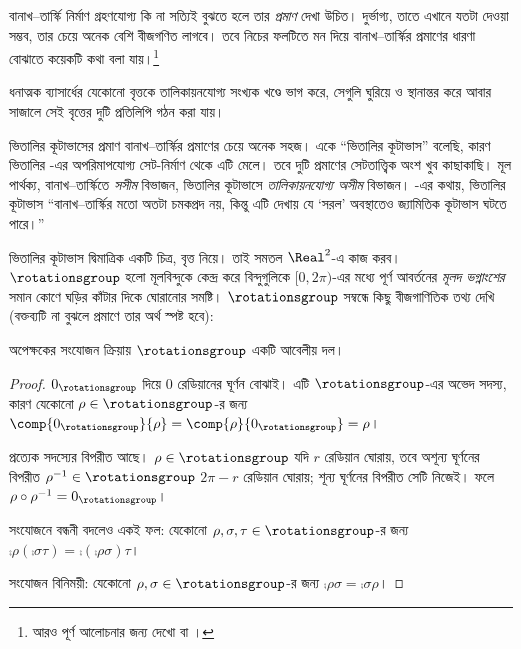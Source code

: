 \documentclass[../../../include/open-logic-section]{subfiles}
\begin{document}

বানাখ--তার্স্কি নির্মাণ গ্রহণযোগ্য কি না
সত্যিই বুঝতে হলে তার \emph{প্রমাণ} দেখা উচিত।
দুর্ভাগ্য, তাতে এখানে যতটা দেওয়া সম্ভব,
তার চেয়ে অনেক বেশি বীজগণিত লাগবে। তবে
নিচের ফলটিতে মন দিয়ে বানাখ--তার্স্কির
প্রমাণের ধারণা বোঝাতে কয়েকটি কথা বলা যায়।\footnote{
আরও পূর্ণ আলোচনার জন্য দেখো \cite{Weston2003}
বা \cite{Wagon2016}।}

\begin{thm}[ভিতালির কূটাভাস ($\ZFC$-এ)]
ধনাত্মক ব্যাসার্ধের যেকোনো বৃত্তকে তালিকায়নযোগ্য সংখ্যক খণ্ডে
ভাগ করে, সেগুলি ঘুরিয়ে ও স্থানান্তর করে
আবার সাজালে সেই বৃত্তের দুটি প্রতিলিপি
গঠন করা যায়।
\end{thm}

ভিতালির কূটাভাসের প্রমাণ বানাখ--তার্স্কির
প্রমাণের চেয়ে অনেক সহজ। একে ``ভিতালির
কূটাভাস'' বলেছি, কারণ ভিতালির
\citeyear{Vitali1905}-এর অপরিমাপযোগ্য
সেট-নির্মাণ থেকে এটি মেলে। তবে দুটি
প্রমাণের সেটতাত্ত্বিক অংশ খুব কাছাকাছি।
মূল পার্থক্য, বানাখ--তার্স্কিতে \emph{সসীম}
বিভাজন, ভিতালির কূটাভাসে \emph{তালিকায়নযোগ্য
অসীম} বিভাজন। \citet{Weston2003}-এর
কথায়, ভিতালির কূটাভাস ``বানাখ--তার্স্কির
মতো অতটা চমকপ্রদ নয়, কিন্তু এটি দেখায় যে
`সরল' অবস্থাতেও জ্যামিতিক কূটাভাস ঘটতে পারে।''

ভিতালির কূটাভাস দ্বিমাত্রিক একটি চিত্র,
বৃত্ত নিয়ে। তাই সমতল $\Real^2$-এ কাজ করব।
$\rotationsgroup$ হলো মূলবিন্দুকে কেন্দ্র করে
বিন্দুগুলিকে $[0,2\pi)$-এর মধ্যে পূর্ণ আবর্তনের
\emph{মূলদ ভগ্নাংশের} সমান কোণে ঘড়ির কাঁটার
দিকে ঘোরানোর সমষ্টি। $\rotationsgroup$ সম্বন্ধে
কিছু বীজগাণিতিক তথ্য দেখি (বক্তব্যটি না বুঝলে
প্রমাণে তার অর্থ স্পষ্ট হবে):

\begin{lem}
অপেক্ষকের সংযোজন ক্রিয়ায়
$\rotationsgroup$ একটি আবেলীয় {দল}।
\end{lem}

\begin{proof}
$0_{\rotationsgroup}$ দিয়ে $0$ রেডিয়ানের
ঘূর্ণন বোঝাই। এটি $\rotationsgroup$-এর
অভেদ সদস্য, কারণ যেকোনো
$\rho\in\rotationsgroup$-র জন্য
$\comp{0_{\rotationsgroup}}{\rho}=
\comp{\rho}{0_{\rotationsgroup}}=\rho$।

প্রত্যেক সদস্যের বিপরীত আছে।
$\rho\in\rotationsgroup$ যদি $r$ রেডিয়ান
ঘোরায়, তবে অশূন্য ঘূর্ণনের বিপরীত
$\rho^{-1}\in\rotationsgroup$
$2\pi-r$ রেডিয়ান ঘোরায়; শূন্য ঘূর্ণনের
বিপরীত সেটি নিজেই। ফলে
$\rho\circ\rho^{-1}=0_\rotationsgroup$।

সংযোজনে বন্ধনী বদলেও একই ফল: যেকোনো
$\rho,\sigma,\tau\in\rotationsgroup$-র
জন্য $\comp{\rho}{(\comp{\sigma}{\tau})}=
\comp{(\comp{\rho}{\sigma})}{\tau}$।

সংযোজন বিনিময়ী: যেকোনো
$\rho,\sigma\in\rotationsgroup$-র জন্য
$\comp{\rho}{\sigma}=\comp{\sigma}{\rho}$।
\end{proof}
\end{document}
